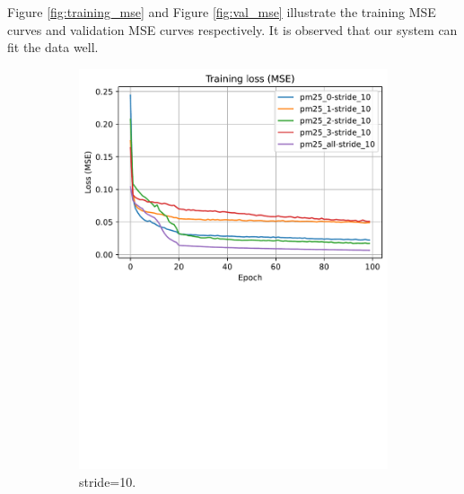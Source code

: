 Figure \ref{fig:training_mse} and Figure \ref{fig:val_mse} illustrate the training MSE curves and validation MSE curves respectively. It is observed that our system can fit the data well.


\begin{figure}[!htbp]
    \centering
    \begin{subfigure}[!htbp]{.45\textwidth}
        \centering
        \includegraphics[width=\textwidth]{fig/results/train_curves_stride_10.pdf}
        \caption{stride=10.}
        \label{fig:train_stride_10}
    \end{subfigure}
    \hfill
    \begin{subfigure}[!htbp]{.45\textwidth}
        \centering

\end{subfigure}
\end{figure}
